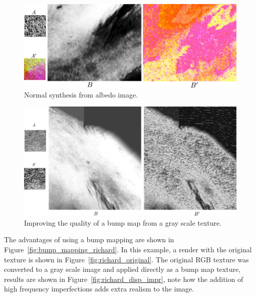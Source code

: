 \documentclass[11pt]{report}
\begin{document}
\begin{figure}[htbp!]
\centering
\includegraphics[width=\textwidth]{img/normal_generation}
	\caption{ Normal synthesis from albedo image.}
	\label{fig:normal_synthesis}
\end{figure}

\begin{figure}[htbp!]
\centering
\includegraphics[width=\textwidth]{img/bump_map_quality_increase}
	\caption{ Improving the quality of a bump map from a gray scale texture.}
	\label{fig:bump_map_quality_increase}
\end{figure}

The advantages of using a bump mapping are shown in Figure~\ref{fig:bump_mapping_richard}.
In this example, a render with the original texture is shown in Figure~\ref{fig:richard_original}.
The original RGB texture was converted to a gray scale image and applied directly as a bump map texture,
results are shown in Figure~\ref{fig:richard_disp_impr}, note how the addition of high frequency imperfections adds extra realism to the image.
\end{document}

